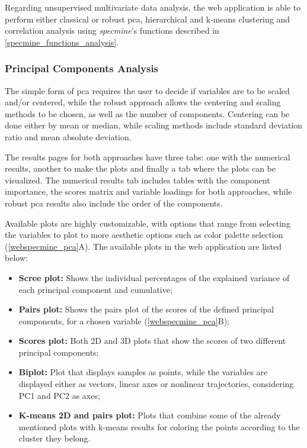 Regarding unsupervised multivariate data analysis, the web application is able to perform either classical or robust \gls{pca}, hierarchical and k-means clustering and correlation analysis using \textit{specmine}'s functions described in \autoref{specmine_functions_analysis}.


\subsubsection{Principal Components Analysis}

The simple form of \gls{pca} requires the user to decide if variables are to be scaled and/or centered, while the robust approach allows the centering and scaling methods to be chosen, as well as the number of components. Centering can be done either by mean or median, while scaling methods include standard deviation ratio and mean absolute deviation.

The results pages for both approaches have three tabs: one with the numerical results, another to make the plots and finally a tab where the plots can be visualized. The numerical results tab includes tables with the component importance, the scores matrix and variable loadings for both approaches, while robust \gls{pca} results also include the order of the components.

Available plots are highly customizable, with options that range from selecting the variables to plot to more aesthetic options such as color palette selection (\autoref{webspecmine_pca}A). The available plots in the web application are listed below:

\begin{itemize}
	\item \textbf{Scree plot:} Shows the individual percentages of the explained variance of each principal component and cumulative;
	
	\item \textbf{Pairs plot:} Shows the pairs plot of the scores of the defined principal components, for a chosen variable (\autoref{webspecmine_pca}B);
	
	\item \textbf{Scores plot:} Both 2D and 3D plots that show the scores of two different principal components;
	
	\item \textbf{Biplot:} Plot that displays samples as points, while the variables are displayed either as vectors, linear axes or nonlinear trajectories, considering PC1 and PC2 as axes;
	
	\item \textbf{K-means 2D and pairs plot:} Plots that combine some of the already mentioned plots with k-means results for coloring the points according to the cluster they belong.
			
\end{itemize}


